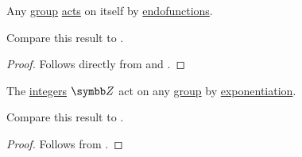 \begin{theorem}\label{thm:cayleys_theorem}
  Any \hyperref[def:group]{group} \hyperref[def:left_group_action]{acts} on itself by \hyperref[def:endofunction]{endofunctions}.

  Compare this result to .
\end{theorem}
\begin{proof}
  Follows directly from  and .
\end{proof}

\begin{proposition}\label{thm:integers_group_action}
  The \hyperref[def:integers]{integers} \( \BZ \) act on any \hyperref[def:group]{group} by \hyperref[def:group/exponentiation]{exponentiation}.

  Compare this result to .
\end{proposition}
\begin{proof}
  Follows from .
\end{proof}
